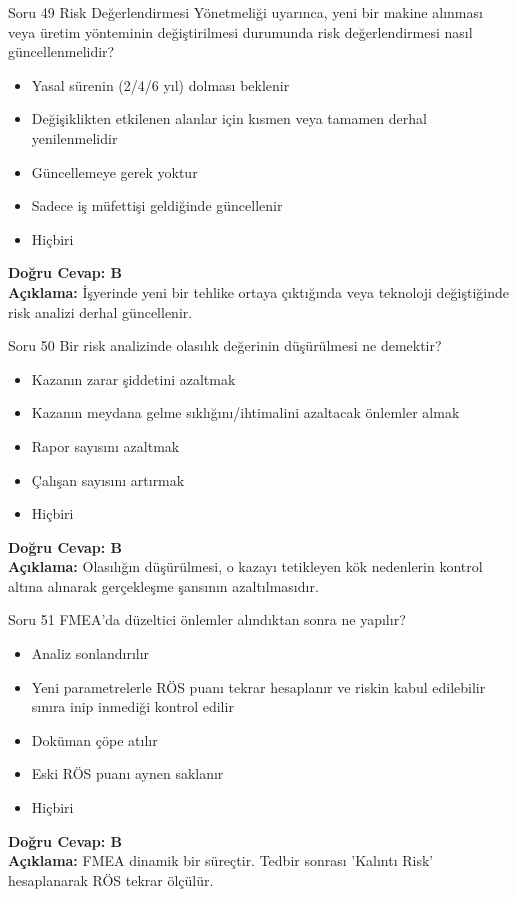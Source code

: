 \documentclass[12pt,a4paper]{article}
\begin{document}
\begin{testcard}{Soru 49}
    Risk Değerlendirmesi Yönetmeliği uyarınca, yeni bir makine alınması veya üretim yönteminin değiştirilmesi durumunda risk değerlendirmesi nasıl güncellenmelidir?
    \begin{itemize}
        \item[A)] Yasal sürenin (2/4/6 yıl) dolması beklenir
        \item[B)] Değişiklikten etkilenen alanlar için kısmen veya tamamen derhal yenilenmelidir
        \item[C)] Güncellemeye gerek yoktur
        \item[D)] Sadece iş müfettişi geldiğinde güncellenir
        \item[E)] Hiçbiri
    \end{itemize}
    \tcblower
    \textbf{Doğru Cevap: B} \\
    \textbf{Açıklama:} İşyerinde yeni bir tehlike ortaya çıktığında veya teknoloji değiştiğinde risk analizi derhal güncellenir.
\end{testcard}

\begin{testcard}{Soru 50}
    Bir risk analizinde olasılık değerinin düşürülmesi ne demektir?
    \begin{itemize}
        \item[A)] Kazanın zarar şiddetini azaltmak
        \item[B)] Kazanın meydana gelme sıklığını/ihtimalini azaltacak önlemler almak
        \item[C)] Rapor sayısını azaltmak
        \item[D)] Çalışan sayısını artırmak
        \item[E)] Hiçbiri
    \end{itemize}
    \tcblower
    \textbf{Doğru Cevap: B} \\
    \textbf{Açıklama:} Olasılığın düşürülmesi, o kazayı tetikleyen kök nedenlerin kontrol altına alınarak gerçekleşme şansının azaltılmasıdır.
\end{testcard}

\begin{testcard}{Soru 51}
    FMEA'da düzeltici önlemler alındıktan sonra ne yapılır?
    \begin{itemize}
        \item[A)] Analiz sonlandırılır
        \item[B)] Yeni parametrelerle RÖS puanı tekrar hesaplanır ve riskin kabul edilebilir sınıra inip inmediği kontrol edilir
        \item[C)] Doküman çöpe atılır
        \item[D)] Eski RÖS puanı aynen saklanır
        \item[E)] Hiçbiri
    \end{itemize}
    \tcblower
    \textbf{Doğru Cevap: B} \\
    \textbf{Açıklama:} FMEA dinamik bir süreçtir. Tedbir sonrası 'Kalıntı Risk' hesaplanarak RÖS tekrar ölçülür.
\end{testcard}
\end{document}

